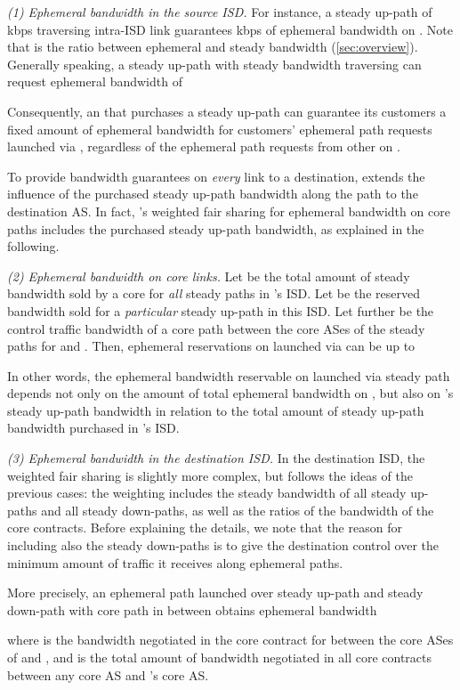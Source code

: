 \emph{(1) Ephemeral bandwidth in the source ISD.}
For instance, a steady up-path of  kbps traversing intra-ISD
link  guarantees  kbps of ephemeral
bandwidth on . Note that  is the
ratio between ephemeral and steady bandwidth
(\autoref{sec:overview}). Generally speaking, a steady up-path
 with steady bandwidth  traversing  can request
ephemeral bandwidth of

Consequently, an \AD that purchases a steady up-path  can
guarantee its customers a fixed amount of ephemeral bandwidth for
customers' ephemeral path requests launched via , regardless of
the ephemeral path requests from other \ADs on .

To provide bandwidth guarantees on \emph{every} link to a destination,
\name extends the influence of the purchased steady up-path
bandwidth along the path to the destination AS. In fact, \name's
weighted fair sharing for ephemeral bandwidth on core paths includes
the purchased steady up-path bandwidth, as explained in the following.

\emph{(2) Ephemeral bandwidth on core links.} Let  be the
total amount of steady bandwidth sold by a core  for \emph{all}
steady paths in 's ISD. Let  be the reserved bandwidth
sold for a \emph{particular} steady up-path  in this ISD. Let
further  be the control traffic bandwidth of a core path 
between the core ASes of the steady paths for  and . Then,
ephemeral reservations on  launched via  can be up to

In other words, the ephemeral bandwidth reservable on  launched via steady
path  depends not only on the amount of total ephemeral
bandwidth on , but also on 's steady up-path bandwidth in
relation to the total amount of steady up-path bandwidth purchased in
's ISD.


\emph{(3) Ephemeral bandwidth in the destination ISD.} In the
destination ISD, the weighted fair sharing is slightly more complex,
but follows the ideas of the previous cases: the weighting includes
the steady bandwidth of all steady up-paths and all steady
down-paths, as well as the ratios of the bandwidth of the core
contracts. Before explaining the details, we note that the reason for
including also the steady down-paths is to give the destination \AD
control over the minimum amount of traffic it receives along
ephemeral paths.

More precisely, an ephemeral path launched over steady up-path 
and steady down-path  with core path  in between obtains
ephemeral bandwidth

where  is the bandwidth negotiated in the core contract
for  between the core ASes of  and , and  is the total
amount of bandwidth negotiated in all core contracts between any core
AS and 's core AS.


